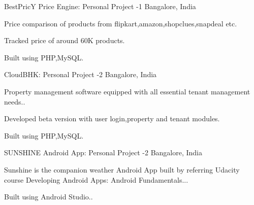 \begin{cventries}
      \cventry
    {BestPricY Price Engine:}
    {Personal Project -1}
    {Bangalore, India}
    {}
    {
      \begin{cvitems}
        \item { Price comparison of products from flipkart,amazon,shopclues,snapdeal etc.}
        \item {Tracked price of around 60K products.}
        \item {Built using PHP,MySQL.}
      \end{cvitems} 
    }

   \cventry
    {CloudBHK:}
    {Personal Project -2}
    {Bangalore, India}
    {}
    {
      \begin{cvitems}
        \item { Property management software equipped with all essential tenant management needs..}
        \item {Developed beta version with user login,property and tenant modules.}
        \item {Built using PHP,MySQL.}
      \end{cvitems} 
    }
    
     \cventry
    {SUNSHINE Android App:}
    {Personal Project -2}
    {Bangalore, India}
    {}
    {
      \begin{cvitems}
        \item { Sunshine is the companion weather Android App built by referring Udacity course Developing Android Apps:
Android Fundamentals...}
        \item {Built using Android Studio..}
      \end{cvitems} 
    }
  
\end{cventries}
